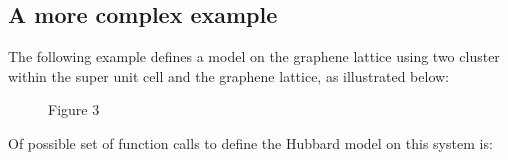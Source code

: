\documentclass[letterpaper,10pt,english]{sphinxmanual}
\let\sphinxpxdimen\pdfpxdimen\else\newdimen\sphinxpxdimen
\begin{document}
\subsection{A more complex example}
\label{\detokenize{defining_models:a-more-complex-example}}
\sphinxAtStartPar
The following example defines a model on the graphene lattice using two cluster within the super unit cell and the graphene lattice, as illustrated below:

\begin{figure}[htbp]
\centering
\capstart

\noindent\sphinxincludegraphics[height=300\sphinxpxdimen]{{h8}.png}
\caption{Figure 3}\label{\detokenize{defining_models:id3}}\end{figure}

\sphinxAtStartPar
Of possible set of function calls to define the Hubbard model on this system is:
\end{document}
